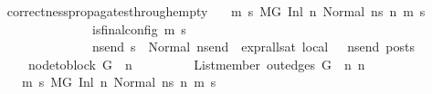 \begin{isabellebody}
\ \ \isamarkupfalse%
\isanewline
{}\isamarkupfalse%
%
\endisatagproof
{\isafoldproof}%
%
\isadelimproof
\isanewline
%
\endisadelimproof
\isanewline
{}\isamarkupfalse%
\ correctness{\isacharunderscore}{\kern0pt}propagates{\isacharunderscore}{\kern0pt}through{\isacharunderscore}{\kern0pt}empty{}{\isacharcolon}{\kern0pt}\isanewline
\ \ \ {\isachardoublequoteopen}{\isasymforall}m\ s{\isachardot}{\kern0pt}\ {\isacharparenleft}{\kern0pt}M{\isacharcomma}{\kern0pt}{\isasymLambda}{\isacharcomma}{\kern0pt}{\isasymGamma}{\isacharcomma}{\kern0pt}{\isasymOmega}{\isacharcomma}{\kern0pt}G\ {\isasymturnstile}{\isacharparenleft}{\kern0pt}Inl\ n{}{\isacharcomma}{\kern0pt}\ Normal\ ns{}{\isacharparenright}{\kern0pt}\ {\isacharminus}{\kern0pt}n{\isasymrightarrow}{\isacharasterisk}{\kern0pt}\ {\isacharparenleft}{\kern0pt}m{\isacharcomma}{\kern0pt}\ s{\isacharparenright}{\kern0pt}{\isacharparenright}{\kern0pt}\ {\isasymlongrightarrow}\ \isanewline
\ \ \ \ \ \ \ \ \ \ \ \ \ \ \ \ \ {\isacharparenleft}{\kern0pt}is{\isacharunderscore}{\kern0pt}final{\isacharunderscore}{\kern0pt}config\ {\isacharparenleft}{\kern0pt}m{\isacharcomma}{\kern0pt}\ s{\isacharparenright}{\kern0pt}\ {\isasymlongrightarrow}\ \isanewline
\ \ \ \ \ \ \ \ \ \ \ \ \ \ \ \ \ {\isacharparenleft}{\kern0pt}{\isasymforall}ns{\isacharunderscore}{\kern0pt}end{\isachardot}{\kern0pt}\ s\ {\isacharequal}{\kern0pt}\ Normal\ ns{\isacharunderscore}{\kern0pt}end\ {\isasymlongrightarrow}\ {\isacharparenleft}{\kern0pt}expr{\isacharunderscore}{\kern0pt}all{\isacharunderscore}{\kern0pt}sat\ {\isasymLambda}{}{\isacharunderscore}{\kern0pt}local\ {\isasymGamma}\ {\isasymOmega}\ ns{\isacharunderscore}{\kern0pt}end{\isacharparenright}{\kern0pt}\ posts{\isacharparenright}{\kern0pt}{\isacharparenright}{\kern0pt}{\isachardoublequoteclose}\isanewline
\ \ \ \ \ \ \ {\isachardoublequoteopen}node{\isacharunderscore}{\kern0pt}to{\isacharunderscore}{\kern0pt}block\ G\ {\isacharbang}{\kern0pt}\ n{}\ {\isacharequal}{\kern0pt}\ {\isacharbrackleft}{\kern0pt}{\isacharbrackright}{\kern0pt}{\isachardoublequoteclose}\isanewline
\ \ \ \ \ \ \ {\isachardoublequoteopen}List{\isachardot}{\kern0pt}member\ {\isacharparenleft}{\kern0pt}out{\isacharunderscore}{\kern0pt}edges\ G\ {\isacharbang}{\kern0pt}\ n{}{\isacharparenright}{\kern0pt}\ n{}{\isachardoublequoteclose}\isanewline
\ \ \ \ \ {\isachardoublequoteopen}{\isasymAnd}\ m\ s{\isachardot}{\kern0pt}\ {\isacharparenleft}{\kern0pt}M{\isacharcomma}{\kern0pt}{\isasymLambda}{\isacharcomma}{\kern0pt}{\isasymGamma}{\isacharcomma}{\kern0pt}{\isasymOmega}{\isacharcomma}{\kern0pt}G\ {\isasymturnstile}{\isacharparenleft}{\kern0pt}Inl\ n{}{\isacharcomma}{\kern0pt}\ Normal\ ns{}{\isacharparenright}{\kern0pt}\ {\isacharminus}{\kern0pt}n{\isasymrightarrow}{\isacharasterisk}{\kern0pt}\ {\isacharparenleft}{\kern0pt}m{\isacharcomma}{\kern0pt}\ s{\isacharparenright}{\kern0pt}{\isacharparenright}{\kern0pt}\ {\isasymLongrightarrow}\ \isanewline

\end{isabellebody}
